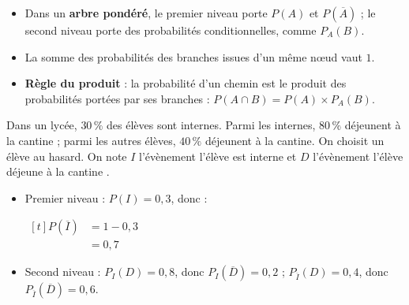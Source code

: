\documentclass[10pt,a4paper]{article}
\begin{document}
\begin{bloc}
\begin{props}
\begin{itemize}
    \item Dans un \textbf{arbre pondéré}, le premier niveau porte \(P(A)\) et \(P(\overline{A})\) ; le second niveau porte des probabilités conditionnelles, comme \(P_A(B)\).
    \item La somme des probabilités des branches issues d'un même nœud vaut \(1\).
    \item \textbf{Règle du produit} : la probabilité d'un chemin est le produit des probabilités portées par ses branches : \(P(A\cap B)=P(A)\times P_A(B)\).
\end{itemize}
\end{props}
\end{bloc}

\begin{bloc}
\begin{exple}
Dans un lycée, \(30\,\%\) des élèves sont internes. Parmi les internes, \(80\,\%\) déjeunent à la cantine ; parmi les autres élèves, \(40\,\%\) déjeunent à la cantine. On choisit un élève au hasard. On note \(I\) l'évènement \og l'élève est interne \fg{} et \(D\) l'évènement \og l'élève déjeune à la cantine \fg{}.

\smallskip
\begin{minipage}{0.5\linewidth}
\centering
{}
\end{minipage}\hfill
\begin{minipage}{0.46\linewidth}
\begin{itemize}
    \item Premier niveau : \(P(I)=0{,}3\), donc :

    \(\begin{aligned}[t] P(\overline{I})&=1-0{,}3\\ &=0{,}7\end{aligned}\)
    \item Second niveau : \(P_I(D)=0{,}8\), donc \(P_I(\overline{D})=0{,}2\) ; \(P_{\overline{I}}(D)=0{,}4\), donc \(P_{\overline{I}}(\overline{D})=0{,}6\).
\end{itemize}
\end{minipage}
\end{exple}
\end{bloc}
\end{document}
